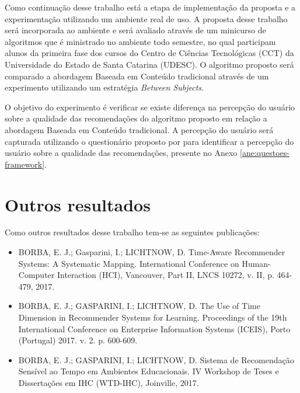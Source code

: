 Como continuação desse trabalho está a etapa de implementação da proposta e a experimentação utilizando um ambiente
real de uso. A proposta desse trabalho será incorporada ao ambiente \adaptwebspace e será avaliado através de um minicurso de
algoritmos que é ministrado no ambiente todo semestre, no qual participam alunos da primeira fase dos cursos
do Centro de Ciências Tecnológicas (CCT) da Universidade do Estado de Santa Catarina (UDESC). O algoritmo proposto será
comparado a abordagem Baseada em Conteúdo tradicional através de um experimento utilizando um estratégia \textit{Between Subjects}.

O objetivo do experimento é verificar se existe diferença na percepção do usuário sobre a qualidade das recomendações do
algoritmo proposto em relação a abordagem Baseada em Conteúdo tradicional. A percepção do usuário será capturada utilizando
o questionário proposto por  para identificar a percepção do usuário sobre a qualidade das recomendações,
presente no Anexo \ref{ane:questoes-framework}.

\section{Outros resultados}

Como outros resultados desse trabalho tem-se as seguintes publicações:

\begin{itemize}
\item BORBA, E. J.; Gasparini, I.; LICHTNOW, D. Time-Aware Recommender Systems: A Systematic Mapping. International Conference on Human-Computer Interaction (HCI), Vancouver, Part II, LNCS 10272, v. II, p. 464-479, 2017.
\item BORBA, E. J.; GASPARINI, I.; LICHTNOW, D. The Use of Time Dimension in Recommender Systems for Learning. Proceedings of the 19th International Conference on Enterprise Information Systems (ICEIS), Porto (Portugal) 2017. v. 2. p. 600-609.
\item BORBA, E. J.; GASPARINI, I.; LICHTNOW, D. Sistema de Recomendação Sensível ao Tempo em Ambientes Educacionais. IV Workshop de Teses e Dissertações em IHC (WTD-IHC), Joinville, 2017.
\end{itemize}
